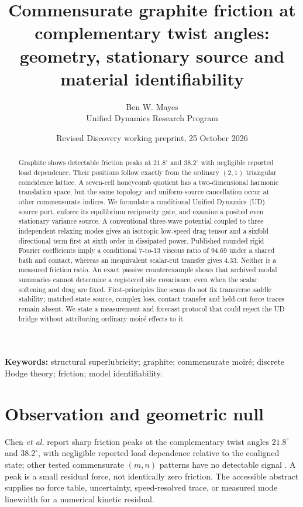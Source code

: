 \documentclass[9pt,a4paper,twocolumn]{extarticle}
\title{Commensurate graphite friction at complementary twist angles:\\geometry, stationary source and material identifiability}
\author{Ben W. Mayes\\\small Unified Dynamics Research Program}
\date{Revised Discovery working preprint, 25 October 2026}
\begin{document}
\maketitle
\begin{abstract}
Graphite shows detectable friction peaks at $21.8^\circ$ and $38.2^\circ$ with negligible reported load dependence. Their positions follow exactly from the ordinary $(2,1)$ triangular coincidence lattice. A seven-cell honeycomb quotient has a two-dimensional harmonic translation space, but the same topology and uniform-source cancellation occur at other commensurate indices. We formulate a conditional Unified Dynamics (UD) source port, enforce its equilibrium reciprocity gate, and examine a posited even stationary variance source. A conventional three-wave potential coupled to three independent relaxing modes gives an isotropic low-speed drag tensor and a sixfold directional term first at sixth order in dissipated power. Published rounded rigid Fourier coefficients imply a conditional 7-to-13 viscous ratio of 94.69 under a shared bath and contact, whereas an inequivalent scalar-cut transfer gives 4.33. Neither is a measured friction ratio. An exact passive counterexample shows that archived modal summaries cannot determine a registered site covariance, even when the scalar softening and drag are fixed. First-principles line scans do not fix transverse saddle stability; matched-state source, complex loss, contact transfer and held-out force traces remain absent. We state a measurement and forecast protocol that could reject the UD bridge without attributing ordinary moir\'e effects to it.
\end{abstract}
\noindent\textbf{Keywords:} structural superlubricity; graphite; commensurate moir\'e; discrete Hodge theory; friction; model identifiability.

\section{Observation and geometric null}
Chen \emph{et al.} report sharp friction peaks at the complementary twist angles $21.8^\circ$ and $38.2^\circ$, with negligible reported load dependence relative to the coaligned state; other tested commensurate $(m,n)$ patterns have no detectable signal \cite{chen}. A peak is a small residual force, not identically zero friction. The accessible abstract supplies no force table, uncertainty, speed-resolved trace, or measured mode linewidth for a numerical kinetic residual.
\end{document}
